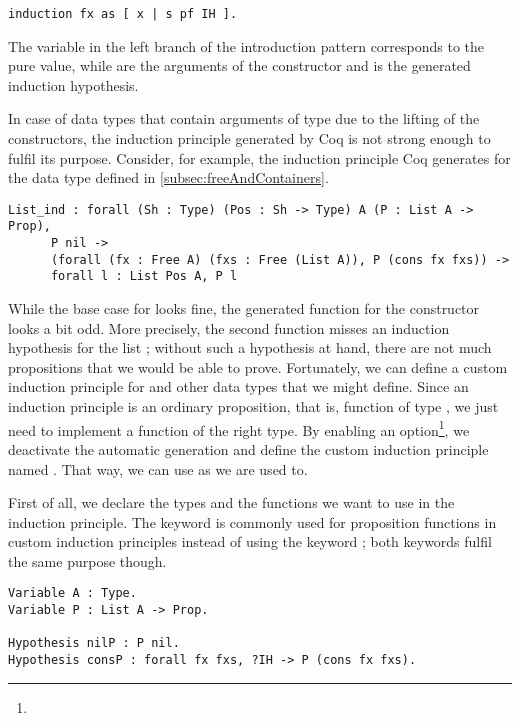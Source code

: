 \begin{verbatim}
induction fx as [ x | s pf IH ].
\end{verbatim}

The variable  in the left branch of the introduction pattern corresponds to the pure value, while   are the arguments of the  constructor and  is the generated induction hypothesis.

In case of data types that contain arguments of type  due to the lifting of the constructors, the induction principle generated by Coq is not strong enough to fulfil its purpose.
Consider, for example, the induction principle Coq generates for the  data type defined in \autoref{subsec:freeAndContainers}.

\begin{verbatim}
List_ind : forall (Sh : Type) (Pos : Sh -> Type) A (P : List A -> Prop),
      P nil ->
      (forall (fx : Free A) (fxs : Free (List A)), P (cons fx fxs)) ->
      forall l : List Pos A, P l
\end{verbatim}

While the base case for  looks fine, the generated function for the  constructor looks a bit odd.
More precisely, the second function misses an induction hypothesis for the list ; without such a hypothesis at hand, there are not much propositions that we would be able to prove.
Fortunately, we can define a custom induction principle for  and other data types that we might define.
Since an induction principle is an ordinary proposition, that is, function of type , we just need to implement a function of the right type.
By enabling an option\footnote{}, we deactivate the automatic generation and define the custom induction principle named .
That way, we can use  as we are used to.

First of all, we declare the types and the functions we want to use in the induction principle.
The keyword  is commonly used for proposition functions in custom induction principles instead of using the keyword ; both keywords fulfil the same purpose though.

\begin{verbatim}
Variable A : Type.
Variable P : List A -> Prop.

Hypothesis nilP : P nil.
Hypothesis consP : forall fx fxs, ?IH -> P (cons fx fxs).
\end{verbatim}

